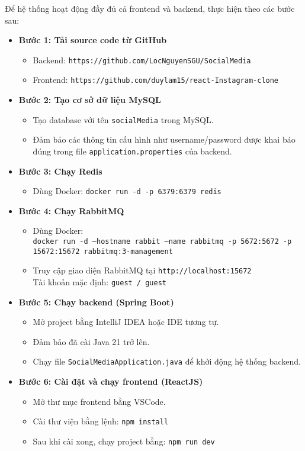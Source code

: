 Để hệ thống hoạt động đầy đủ cả frontend và backend, thực hiện theo các bước sau:

\begin{itemize}
    \item \textbf{Bước 1: Tải source code từ GitHub}
    \begin{itemize}
        \item Backend: \texttt{https://github.com/LocNguyenSGU/SocialMedia}
        \item Frontend: \texttt{https://github.com/duylam15/react-Instagram-clone}
    \end{itemize}
    
    \item \textbf{Bước 2: Tạo cơ sở dữ liệu MySQL}
    \begin{itemize}
        \item Tạo database với tên \texttt{socialMedia} trong MySQL.
        \item Đảm bảo các thông tin cấu hình như username/password được khai báo đúng trong file \texttt{application.properties} của backend.
    \end{itemize}
    
    \item \textbf{Bước 3: Chạy Redis}
    \begin{itemize}
        \item Dùng Docker: \texttt{docker run -d -p 6379:6379 redis}
    \end{itemize}
    
    \item \textbf{Bước 4: Chạy RabbitMQ}
    \begin{itemize}
        \item Dùng Docker: \\
        \texttt{docker run -d --hostname rabbit --name rabbitmq -p 5672:5672 -p 15672:15672 rabbitmq:3-management}
        \item Truy cập giao diện RabbitMQ tại \texttt{http://localhost:15672} \\
        Tài khoản mặc định: \texttt{guest / guest}
    \end{itemize}
    
    \item \textbf{Bước 5: Chạy backend (Spring Boot)}
    \begin{itemize}
        \item Mở project bằng IntelliJ IDEA hoặc IDE tương tự.
        \item Đảm bảo đã cài Java 21 trở lên.
        \item Chạy file \texttt{SocialMediaApplication.java} để khởi động hệ thống backend.
    \end{itemize}
    
    \item \textbf{Bước 6: Cài đặt và chạy frontend (ReactJS)}
    \begin{itemize}
        \item Mở thư mục frontend bằng VSCode.
        \item Cài thư viện bằng lệnh: \texttt{npm install}
        \item Sau khi cài xong, chạy project bằng: \texttt{npm run dev}
    \end{itemize}
\end{itemize}